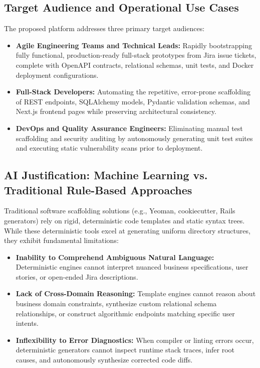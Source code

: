 \documentclass[10pt,journal,compsoc]{IEEEtran}
\begin{document}
\subsection{Target Audience and Operational Use Cases}
The proposed platform addresses three primary target audiences:
\begin{itemize}
    \item \textbf{Agile Engineering Teams and Technical Leads:} Rapidly bootstrapping fully functional, production-ready full-stack prototypes from Jira issue tickets, complete with OpenAPI contracts, relational schemas, unit tests, and Docker deployment configurations.
    \item \textbf{Full-Stack Developers:} Automating the repetitive, error-prone scaffolding of REST endpoints, SQLAlchemy models, Pydantic validation schemas, and Next.js frontend pages while preserving architectural consistency.
    \item \textbf{DevOps and Quality Assurance Engineers:} Eliminating manual test scaffolding and security auditing by autonomously generating unit test suites and executing static vulnerability scans prior to deployment.
\end{itemize}

\subsection{AI Justification: Machine Learning vs. Traditional Rule-Based Approaches}
Traditional software scaffolding solutions (e.g., Yeoman, cookiecutter, Rails generators) rely on rigid, deterministic code templates and static syntax trees. While these deterministic tools excel at generating uniform directory structures, they exhibit fundamental limitations:
\begin{itemize}
    \item \textbf{Inability to Comprehend Ambiguous Natural Language:} Deterministic engines cannot interpret nuanced business specifications, user stories, or open-ended Jira descriptions.
    \item \textbf{Lack of Cross-Domain Reasoning:} Template engines cannot reason about business domain constraints, synthesize custom relational schema relationships, or construct algorithmic endpoints matching specific user intents.
    \item \textbf{Inflexibility to Error Diagnostics:} When compiler or linting errors occur, deterministic generators cannot inspect runtime stack traces, infer root causes, and autonomously synthesize corrected code diffs.
\end{itemize}
\end{document}
